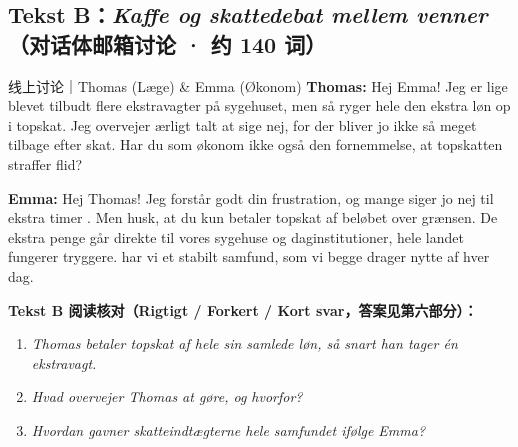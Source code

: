 \subsection*{Tekst B：\textit{Kaffe og skattedebat mellem venner}（对话体邮箱讨论 · 约 140 词）}

\begin{emailbox}{线上讨论｜Thomas (Læge) \& Emma (Økonom)}
\textbf{Thomas:} Hej Emma! Jeg er lige blevet tilbudt flere ekstravagter på sygehuset, men så ryger hele den ekstra løn op i topskat. Jeg overvejer ærligt talt at sige nej, for der bliver jo ikke så meget tilbage efter skat. Har du som økonom ikke også den fornemmelse, at topskatten straffer flid?

\textbf{Emma:} Hej Thomas! Jeg forstår godt din frustration, og mange siger jo nej til ekstra timer . Men husk, at du kun betaler topskat af beløbet over grænsen. De ekstra penge går direkte til vores sygehuse og daginstitutioner,  hele landet fungerer tryggere.  har vi et stabilt samfund, som vi begge drager nytte af hver dag.
\end{emailbox}

\textbf{Tekst B 阅读核对（Rigtigt / Forkert / Kort svar，答案见第六部分）：}
\begin{enumerate}
  \item \textit{Thomas betaler topskat af hele sin samlede løn, så snart han tager én ekstravagt.} \underline{\hspace{2.2cm}}
  \item \textit{Hvad overvejer Thomas at gøre, og hvorfor?} \underline{\hspace{4.8cm}}
  \item \textit{Hvordan gavner skatteindtægterne hele samfundet ifølge Emma?} \underline{\hspace{4.8cm}}
\end{enumerate}

